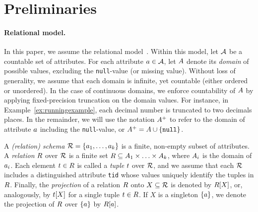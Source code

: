 \section{Preliminaries}
\label{sec:preliminaries}

\paragraph{Relational model.}
In this paper, we assume the relational model~\cite{Codd1970}.
Within this model, let $\mathcal{A}$ be a countable set of attributes.
For each attribute $a \in \mathcal{A}$, let $A$ denote its \emph{domain} of possible values, excluding the \texttt{null}-value (or missing value).
Without loss of generality, we assume that each domain is infinite, yet countable (either ordered or unordered).
In the case of continuous domains, we enforce countability of $A$ by applying fixed-precision truncation on the domain values.
For instance, in Example~\ref{ex:runningexample}, each decimal number is truncated to two decimals places.
In the remainder, we will use the notation $A^+$ to refer to the domain of attribute $a$ including the \texttt{null}-value, or $A^+ = A \cup \{\texttt{null}\}$.

A \emph{(relation) schema} $\mathcal{R} = \{a_{1},\ldots,a_{k}\}$ is a finite, non-empty subset of attributes.
A \emph{relation} $R$ over $\mathcal{R}$ is a finite set $R \subseteq A_{1} \times \ldots \times A_{k}$, where $A_{i}$ is the domain of $a_{i}$.
Each element $t \in R$ is called a \emph{tuple} $t$ over $\mathcal{R}$, and we assume that each $\mathcal{R}$ includes a distinguished attribute \texttt{tid} whose values uniquely identify the tuples in $R$.
Finally, the \emph{projection} of a relation $R$ onto $X \subseteq \mathcal{R}$ is denoted by $R[X]$, or, analogously, by $t[X]$ for a single tuple $t \in R$.
If $X$ is a singleton $\{a\}$, we denote the projection of $R$ over $\{a\}$ by $R[a]$.


